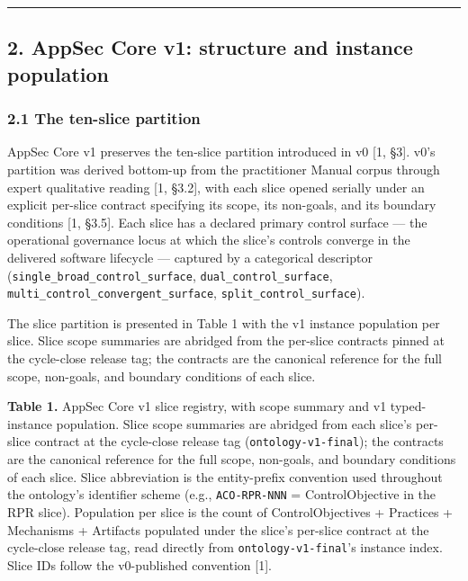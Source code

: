 \documentclass[
]{article}
\begin{document}
\begin{center}\rule{0.5\linewidth}{0.5pt}\end{center}

\subsection{2. AppSec Core v1: structure and instance
population}\label{appsec-core-v1-structure-and-instance-population}

\subsubsection{2.1 The ten-slice
partition}\label{the-ten-slice-partition}

AppSec Core v1 preserves the ten-slice partition introduced in v0 {[}1,
§3{]}. v0's partition was derived bottom-up from the practitioner Manual
corpus through expert qualitative reading {[}1, §3.2{]}, with each slice
opened serially under an explicit per-slice contract specifying its
scope, its non-goals, and its boundary conditions {[}1, §3.5{]}. Each
slice has a declared primary control surface --- the operational
governance locus at which the slice's controls converge in the delivered
software lifecycle --- captured by a categorical descriptor
(\texttt{single\_broad\_control\_surface},
\texttt{dual\_control\_surface},
\texttt{multi\_control\_convergent\_surface},
\texttt{split\_control\_surface}).

The slice partition is presented in Table 1 with the v1 instance
population per slice. Slice scope summaries are abridged from the
per-slice contracts pinned at the cycle-close release tag; the contracts
are the canonical reference for the full scope, non-goals, and boundary
conditions of each slice.

\textbf{Table 1.} AppSec Core v1 slice registry, with scope summary and
v1 typed-instance population. Slice scope summaries are abridged from
each slice's per-slice contract at the cycle-close release tag
(\texttt{ontology-v1-final}); the contracts are the canonical reference
for the full scope, non-goals, and boundary conditions of each slice.
Slice abbreviation is the entity-prefix convention used throughout the
ontology's identifier scheme (e.g., \texttt{ACO-RPR-NNN} =
ControlObjective in the RPR slice). Population per slice is the count of
ControlObjectives + Practices + Mechanisms + Artifacts populated under
the slice's per-slice contract at the cycle-close release tag, read
directly from \texttt{ontology-v1-final}'s instance index. Slice IDs
follow the v0-published convention {[}1{]}.
\end{document}
